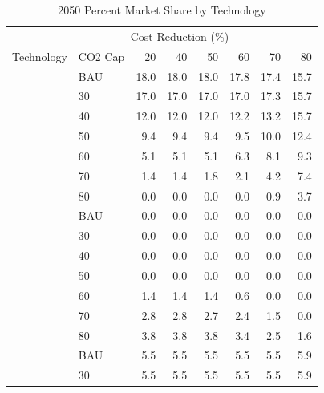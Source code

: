 \documentclass[]{article}
\begin{document}
\begin{longtable}{>{\raggedright\arraybackslash}p{2 cm}lrrrrrr}
\caption{\label{tab:unnamed-chunk-3}2050 Percent Market Share by Technology}\\
\toprule
\multicolumn{2}{c}{ } & \multicolumn{6}{c}{Cost Reduction (\%)} \\
\cmidrule(l{3pt}r{3pt}){3-8}
Technology & CO2 Cap & 20 & 40 & 50 & 60 & 70 & 80\\
\midrule
\rowcolor{gray!6}   & BAU & 18.0 & 18.0 & 18.0 & 17.8 & 17.4 & 15.7\\

 & 30 & 17.0 & 17.0 & 17.0 & 17.0 & 17.3 & 15.7\\

\rowcolor{gray!6}   & 40 & 12.0 & 12.0 & 12.0 & 12.2 & 13.2 & 15.7\\

 & 50 & 9.4 & 9.4 & 9.4 & 9.5 & 10.0 & 12.4\\

\rowcolor{gray!6}   & 60 & 5.1 & 5.1 & 5.1 & 6.3 & 8.1 & 9.3\\

 & 70 & 1.4 & 1.4 & 1.8 & 2.1 & 4.2 & 7.4\\

\rowcolor{gray!6}  \multirow{-7}{2 cm}{\raggedright\arraybackslash Coal} & 80 & 0.0 & 0.0 & 0.0 & 0.0 & 0.9 & 3.7\\
\cmidrule{1-8}
 & BAU & 0.0 & 0.0 & 0.0 & 0.0 & 0.0 & 0.0\\

\rowcolor{gray!6}   & 30 & 0.0 & 0.0 & 0.0 & 0.0 & 0.0 & 0.0\\

 & 40 & 0.0 & 0.0 & 0.0 & 0.0 & 0.0 & 0.0\\

\rowcolor{gray!6}   & 50 & 0.0 & 0.0 & 0.0 & 0.0 & 0.0 & 0.0\\

 & 60 & 1.4 & 1.4 & 1.4 & 0.6 & 0.0 & 0.0\\

\rowcolor{gray!6}   & 70 & 2.8 & 2.8 & 2.7 & 2.4 & 1.5 & 0.0\\

\multirow{-7}{2 cm}{\raggedright\arraybackslash Coal CCS} & 80 & 3.8 & 3.8 & 3.8 & 3.4 & 2.5 & 1.6\\
\cmidrule{1-8}
\rowcolor{gray!6}   & BAU & 5.5 & 5.5 & 5.5 & 5.5 & 5.5 & 5.9\\

 & 30 & 5.5 & 5.5 & 5.5 & 5.5 & 5.5 & 5.9\\


\end{longtable}
\end{document}
